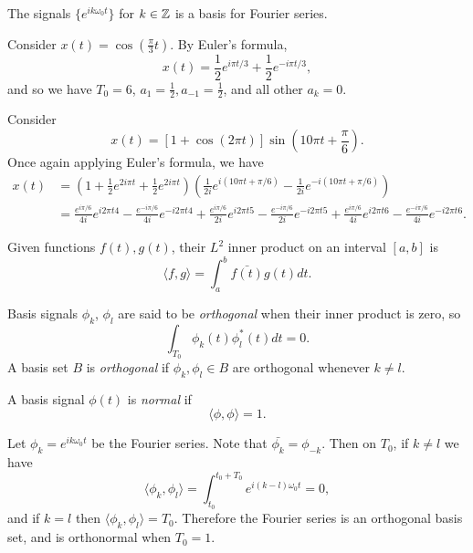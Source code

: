 \begin{exmp}
    The signals $\{e^{ik\omega_0t}\}$ for $k \in \mathbb{Z}$ is a basis for Fourier series.
\end{exmp}

\begin{exmp}
    Consider $x(t) = \cos\left(\frac{\pi}{3}t\right)$. By Euler's formula,
    \[x(t) = \frac{1}{2}e^{i\pi t/3} + \frac{1}{2}e^{-i\pi t/3},\]
    and so we have $T_0 = 6$, $a_1 = \frac{1}{2}, a_{-1} = \frac{1}{2}$, and all other $a_k = 0$.
\end{exmp}

\begin{exmp}
    Consider
    \[x(t) = \left[1 + \cos\left(2\pi t\right)\right]\sin\left(10\pi t + \frac{\pi}{6}\right).\]
    Once again applying Euler's formula, we have
    \begin{align*}
        x(t) &= \left(1 + \frac{1}{2}e^{2i\pi t} + \frac{1}{2}e^{2i\pi t}\right)\left(\frac{1}{2i}e^{i(10\pi t + \pi/6)} - \frac{1}{2i}e^{-i(10\pi t + \pi/6)}\right) \\
        &= \frac{e^{i\pi/6}}{4i}e^{i2\pi t4} - \frac{e^{-i\pi/6}}{4i}e^{-i2\pi t4} + \frac{e^{i\pi/6}}{2i}e^{i2\pi t5} - \frac{e^{-i\pi/6}}{2i}e^{-i2\pi t5} + \frac{e^{i\pi/6}}{4i}e^{i2\pi t6} - \frac{e^{-i\pi/6}}{4i}e^{-i2\pi t6}.
    \end{align*}
\end{exmp}

\begin{defn}
    Given functions $f(t), g(t)$, their \emph{$L^2$} inner product on an interval $[a, b]$ is
    \[\langle f, g \rangle = \int_a^b \bar{f(t)}g(t)dt.\]
\end{defn}

\begin{defn}
    Basis signals $\phi_k$, $\phi_l$ are said to be \emph{orthogonal} when their inner product is zero, so
    \[\int_{T_0}\phi_k(t)\phi_l^{*}(t)dt = 0.\]
    A basis set $B$ is \emph{orthogonal} if $\phi_k, \phi_l \in B$ are orthogonal whenever $k \neq l$.
\end{defn}

\begin{defn}
    A basis signal $\phi(t)$ is \emph{normal} if
    \[\langle \phi, \phi \rangle = 1.\]
\end{defn}

\begin{exmp}
    Let $\phi_k = e^{ik\omega_0t}$ be the Fourier series. Note that $\bar{\phi_k} = \phi_{-k}$. Then on $T_0$,
    if $k \neq l$ we have
    \[\langle \phi_k, \phi_l \rangle = \int_{t_0}^{t_0+T_0}e^{i(k-l)\omega_0t} = 0,\]
    and if $k = l$ then $\langle \phi_k, \phi_l \rangle = T_0$. Therefore the Fourier series is an orthogonal basis set, and is orthonormal when $T_0 = 1$.
\end{exmp}

